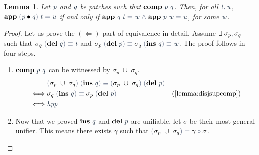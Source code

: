 \documentclass{article}
\theoremstyle{definition}
\theoremstyle{plain}
\newtheorem{lemma}{Lemma}
\newcommand*{\mathcolor}{}
\def\mathcolor#1#{\mathcoloraux{#1}}
\newcommand*{\mathcoloraux}[3]{%
  \protect\leavevmode
  \begingroup
    \color#1{#2}#3%
  \endgroup
}
\newcommand{\HSSpecial}[1]{\mathcolor{hsblue4}{\ensuremath{#1}}}
\newcommand{\HSSym}[1]{\mathcolor{hsblue4}{\ensuremath{#1}}}
\newcommand{\HSVar}[1]{\mathcolor{hsblue5}{\mathit{\ensuremath{#1}}}}
\begin{document}
\begin{lemma}
  Let \ensuremath{\HSVar{p}} and \ensuremath{\HSVar{q}} be patches such that \ensuremath{\comp{\HSVar{p}}{\HSVar{q}}}. Then,
for all \ensuremath{\HSVar{t}\HSSpecial{,}\HSVar{u}}, \ensuremath{\app{\HSSpecial{(}\after{\HSVar{p}}{\HSVar{q}}\HSSpecial{)}}{\HSVar{t}}\HSSym{\mathrel{=}}\HSVar{u}} if and only if \ensuremath{\app{\HSVar{q}}{\HSVar{t}}\HSSym{\mathrel{=}}\HSVar{w}\HSSym{\mathrel{\wedge}}\app{\HSVar{p}}{\HSVar{w}}\HSSym{\mathrel{=}}\HSVar{u}}, for some \ensuremath{\HSVar{w}}. 
\end{lemma}
\begin{proof}
Let us prove the $(\Leftarrow)$ part of equivalence in detail.
Assume \ensuremath{\exists\;\sigma_p\HSSpecial{,}\sigma_q} such that \ensuremath{\sigma_q\;\HSSpecial{(}\pdel{\HSVar{q}}\HSSpecial{)}\HSSym{\equiv} \HSVar{t}}
and \ensuremath{\sigma_p\;\HSSpecial{(}\pdel{\HSVar{p}}\HSSpecial{)}\HSSym{\equiv} \sigma_q\;\HSSpecial{(}\pins{\HSVar{q}}\HSSpecial{)}\HSSym{\equiv} \HSVar{w}}. The proof follows
in four steps.

\begin{enumerate}
\item \ensuremath{\comp{\HSVar{p}}{\HSVar{q}}} can be witnessed by \ensuremath{\sigma_p\;\cup\;\sigma_q}.
\begin{align*}
      & \ensuremath{\HSSpecial{(}\sigma_p\;\cup\;\sigma_q\HSSpecial{)}\;\HSSpecial{(}\pins{\HSVar{q}}\HSSpecial{)}\HSSym{\equiv} \HSSpecial{(}\sigma_p\;\cup\;\sigma_q\HSSpecial{)}\;\HSSpecial{(}\pdel{\HSVar{p}}\HSSpecial{)}} & \\
 \iff & \ensuremath{\sigma_q\;\HSSpecial{(}\pins{\HSVar{q}}\HSSpecial{)}\HSSym{\equiv} \sigma_p\;\HSSpecial{(}\pdel{\HSVar{p}}\HSSpecial{)}} & (\Cref{lemma:disjsupcomp})\\
 \iff & \ensuremath{\HSVar{hyp}}
\end{align*}

\item Now that we proved \ensuremath{\pins{\HSVar{q}}} and \ensuremath{\pdel{\HSVar{p}}} are unifiable, let \ensuremath{\sigma} be their
most general unifier. This means there exists \ensuremath{\gamma} such that \ensuremath{\HSSpecial{(}\sigma_p\;\cup\;\sigma_q\HSSpecial{)}\HSSym{\mathrel{=}}\gamma\HSSym{\mathbin{\circ}}\sigma}.


\end{enumerate}
\end{proof}
\end{document}
